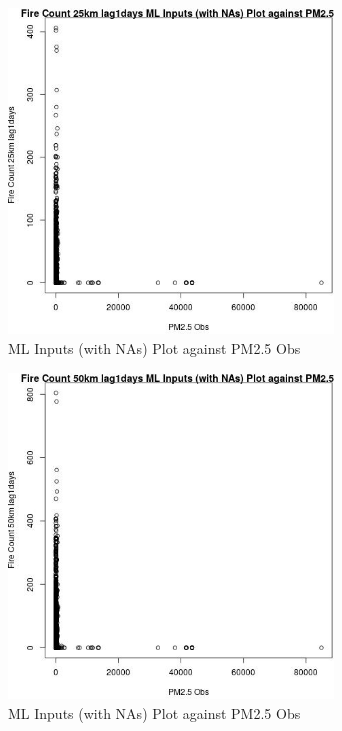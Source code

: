 \begin{figure} 
\centering  
\includegraphics[width=0.77\textwidth]{Code_Outputs/Report_ML_input_PM25_Step4_part_f_de_duplicated_aves_prioritize_24hr_obswNAs_Fire_Count_25km_lag1daysvPM25_Obs.jpg} 
\caption{\label{fig:Report_ML_input_PM25_Step4_part_f_de_duplicated_aves_prioritize_24hr_obswNAsFire_Count_25km_lag1daysvPM25_Obs}ML Inputs (with NAs) Plot against PM2.5 Obs} 
\end{figure} 
 

\begin{figure} 
\centering  
\includegraphics[width=0.77\textwidth]{Code_Outputs/Report_ML_input_PM25_Step4_part_f_de_duplicated_aves_prioritize_24hr_obswNAs_Fire_Count_50km_lag1daysvPM25_Obs.jpg} 
\caption{\label{fig:Report_ML_input_PM25_Step4_part_f_de_duplicated_aves_prioritize_24hr_obswNAsFire_Count_50km_lag1daysvPM25_Obs}ML Inputs (with NAs) Plot against PM2.5 Obs} 
\end{figure} 
 

